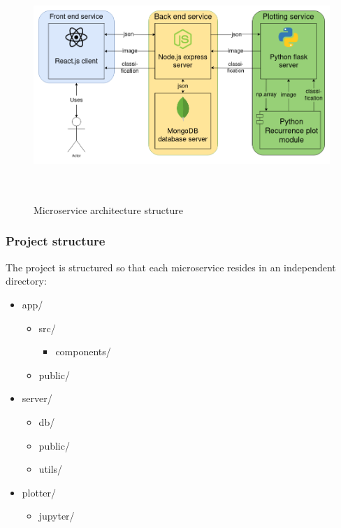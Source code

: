 \documentclass[a4paper,12pt,fleqn]{article}
\begin{document}
\begin{figure}[h]
  \centering
  {\includegraphics[height=8cm]{assets/architecture_diagram.png}}
  \caption{Microservice architecture structure}
  \label{fig:architecture_diagram}
\end{figure}


\subsubsection{Project structure}
The project is structured so that each microservice resides in an independent directory:
\begin{itemize}
  \item app/
        \begin{itemize}
          \item src/
                \begin{itemize}
                  \item components/
                \end{itemize}
          \item public/
        \end{itemize}
  \item server/
        \begin{itemize}
          \item db/
          \item public/
          \item utils/
        \end{itemize}
  \item plotter/
        \begin{itemize}
          \item jupyter/
        \end{itemize}
\end{itemize}
\end{document}
